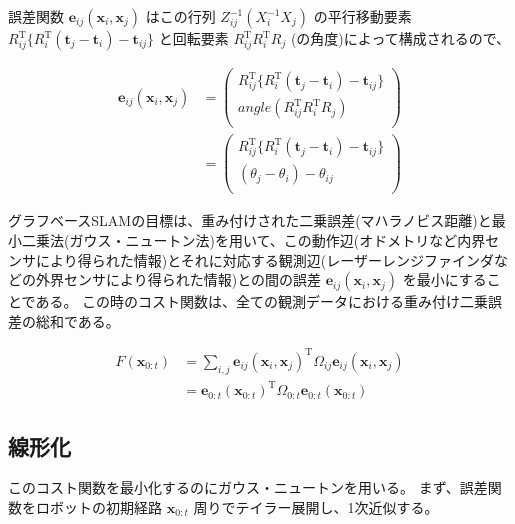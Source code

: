 \documentclass{article}
\begin{document}
\newpage

誤差関数 $\bm{e}_{ij}(\bm{x}_i, \bm{x}_j)$ はこの行列 $Z_{ij}^{-1} (X_i^{-1} X_j)$ の平行移動要素 $R_{ij}^{\mathrm{T}}\{R_i^{\mathrm{T}}(\bm{t}_j-\bm{t}_i)-\bm{t}_{ij}\}$ と回転要素 $R_{ij}^{\mathrm{T}}R_i^{\mathrm{T}}R_j$ (の角度)によって構成されるので、

\[
\begin{align}
\bm{e}_{ij}(\bm{x}_i, \bm{x}_j) &=
\left(
  \begin{array}{cc}
    R_{ij}^{\mathrm{T}}\{R_i^{\mathrm{T}}(\bm{t}_j-\bm{t}_i)-\bm{t}_{ij}\} \\
                                   angle(R_{ij}^{\mathrm{T}}R_i^{\mathrm{T}}R_j) \\
  \end{array}
\right) \\ &=
\left(
  \begin{array}{cc}
    R_{ij}^{\mathrm{T}}\{R_i^{\mathrm{T}}(\bm{t}_j-\bm{t}_i)-\bm{t}_{ij}\} \\
                                             (\theta_j - \theta_i) - \theta_{ij} \\
  \end{array}
\right)
\end{align}
\]

グラフベースSLAMの目標は、重み付けされた二乗誤差(マハラノビス距離)と最小二乗法(ガウス・ニュートン法)を用いて、この動作辺(オドメトリなど内界センサにより得られた情報)とそれに対応する観測辺(レーザーレンジファインダなどの外界センサにより得られた情報)との間の誤差 $\bm{e}_{ij}(\bm{x}_i, \bm{x}_j)$ を最小にすることである。
この時のコスト関数は、全ての観測データにおける重み付け二乗誤差の総和である。

\[
\begin{align}
F(\bm{x}_{0:t}) &=
\sum_{i,j} \bm{e}_{ij}(\bm{x}_i, \bm{x}_j)^{\mathrm{T}} \Omega_{ij} \bm{e}_{ij}(\bm{x}_i, \bm{x}_j) \\ &=
\bm{e}_{0:t}(\bm{x}_{0:t})^{\mathrm{T}} \Omega_{0:t} \bm{e}_{0:t}(\bm{x}_{0:t})
\end{align}
\]

\subsection{線形化}

このコスト関数を最小化するのにガウス・ニュートンを用いる。
まず、誤差関数をロボットの初期経路 $\bm{x}_{0:t}$ 周りでテイラー展開し、1次近似する。
\end{document}
